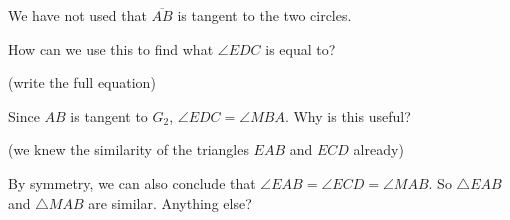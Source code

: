 

We have not used that $\overline{AB}$ is tangent to the two circles.

How can we use this to find what $\angle EDC$ is equal to?

(write the full equation)







Since $AB$ is tangent to $G_2$, $\angle EDC = \angle MBA$. Why is this useful?

(we knew the similarity of the triangles  $EAB$ and $ECD$ already)







By symmetry, we can also conclude that $\angle EAB = \angle ECD = \angle MAB$. So $\triangle EAB$ and $\triangle MAB$ are similar. Anything else?

